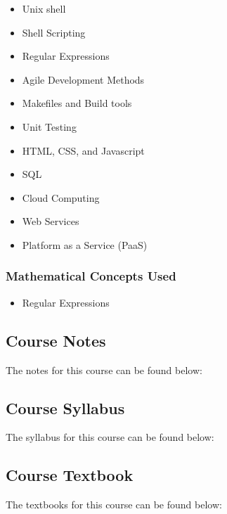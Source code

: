 {\begin{highlight}[\CSPBSoftDev]
        \begin{itemize}
            \item Unix shell
            \item Shell Scripting
            \item Regular Expressions
            \item Agile Development Methods
            \item Makefiles and Build tools
            \item Unit Testing
            \item HTML, CSS, and Javascript
            \item SQL
            \item Cloud Computing
            \item Web Services
            \item Platform as a Service (PaaS)
        \end{itemize}
        
        \subsubsection*{Mathematical Concepts Used}
    
        \begin{itemize}
            \item Regular Expressions
        \end{itemize}
    \end{highlight}
}

\subsection{Course Notes}

The notes for this course can be found below:

\subsection{Course Syllabus}

The syllabus for this course can be found below: \coursedoc{\CSPBSoftDevSyllabus}

\subsection{Course Textbook}

The textbooks for this course can be found below: \coursedoc{\CSPBSoftDevAgileTextbook} \coursedoc{\CSPBSoftDevEngTextbook} \coursedoc{\CSPBSoftDevProGitTextbook} \coursedoc{\CSPBSoftDevLinuxTextbook}